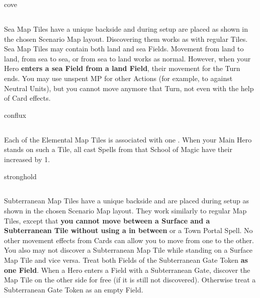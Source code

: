 \clearpage

\begin{multicols}{2}
\begin{expansion}{cove}
  \subsection*{}
  Sea Map Tiles have a unique backside and during setup are placed as shown in the chosen Scenario Map layout.
  Discovering them works as with regular Tiles.
  Sea Map Tiles may contain both land and sea Fields.
  Movement from land to land, from sea to sea, or from sea to land works as normal.
  However, when your Hero \textbf{enters a sea Field from a land Field}, their movement for the Turn ends.
  You may use unspent MP for other Actions (for example, to  against Neutral Units), but you cannot move anymore that Turn, not even with the help of Card effects.
\end{expansion}

\bigskip

\begin{expansion}{conflux}
  \subsection*{}
  Each of the Elemental Map Tiles is associated with one .
  When your Main Hero stands on such a Tile, all cast Spells from that School of Magic have their  increased by 1.
\end{expansion}

\bigskip

\begin{expansion}{stronghold}
  \subsection*{}
  Subterranean Map Tiles have a unique backside and are placed during setup as shown in the chosen Scenario Map layout.
  They work similarly to regular Map Tiles, except that \textbf{you cannot move between a Surface and a Subterranean Tile without using a  in between} or a Town Portal Spell.
  No other movement effects from Cards can allow you to move from one to the other.
  You also may not discover a Subterranean Map Tile while standing on a Surface Map Tile and vice versa.
  Treat both Fields of the Subterranean Gate Token \textbf{as one Field}.
  When a Hero enters a Field with a Subterranean Gate, discover the Map Tile on the other side for free (if it is still not discovered).
  Otherwise treat a Subterranean Gate Token as an empty Field.
\end{expansion}
\columnbreak


\end{multicols}
